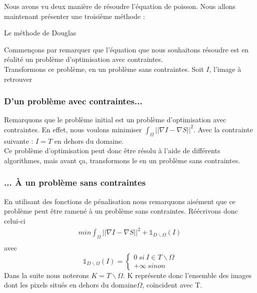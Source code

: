 Nous avons vu deux manière de résoudre l'équation de poisson. Nous allons maintenant présenter une troisième méthode  : \\
\begin{center}
Le méthode de Douglas
\end{center}
Commençons par remarquer que l'équation que nous souhaitons résoudre est en réalité un problème d'optimisation avec contraintes.\\
Transformons ce problème, en un problème sans contraintes. Soit $I$, l'image à retrouver
\subsubsection{D'un problème avec contraintes...}
Remarquons que le problème initial est un problème d'optimisation avec contraintes. En effet, nous voulons minimiser $\int_\Omega ||\nabla I-\nabla S||^2$. Avec la contrainte suivante : $I = T$ en dehors du domaine. \\
Ce problème d'optimisation peut donc être résolu à l'aide de différents algorithmes, mais avant ça, transformons le en un problème sans contraintes. 

\subsubsection{... À un problème sans contraintes}
En utilisant des fonctions de pénalisation nous remarquons aisément que ce problème peut être ramené à un problème sans contraintes. Réécrivons donc celui-ci 
\begin{equation*}
\begin{aligned}{}
    min \int_\Omega ||\nabla I - \nabla S||^2 + \mathbb{1} _{D \backslash \Omega } (I) \\
    \end{aligned}
\end{equation*}{}
avec 
\begin{equation*}
\mathbb{1}_{ D \backslash \Omega }(I) =
	\left\{
	\begin{aligned}{}
	0 \ si\  I \in T \backslash \Omega \\
	+ \infty \ sinon
    \end{aligned}
    \right.
\end{equation*}{}
Dans la suite nous noterons $K = T\backslash \Omega$. K représente donc l'ensemble des images dont les pixels situés en dehors du domaine$\Omega$, coïncident avec T.\\

